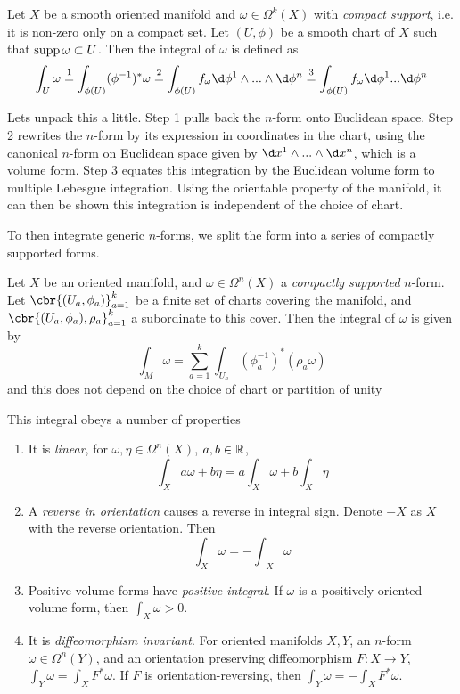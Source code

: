 \begin{definition}
	\label{def:compact_n-form_integration}
	Let \(X\) be a smooth oriented manifold and \(\omega \in \Omega^k(X)\) with \emph{compact support}, i.e. it is non-zero only on a compact set.
	Let \((U, \phi)\) be a smooth chart of \(X\) such that \(\operatorname{supp} \omega \subset U\).
	Then the integral of \(\omega\) is defined as
	\[
		\int_U \omega \overset{1}{=} \int_{\phi(U)} (\phi^{-1})^* \omega \overset{2}{=} \int_{\phi(U)} f_\omega \d\phi^1\wedge ... \wedge \d\phi^n \overset{3}{=}  \int_{\phi(U)} f_\omega \d\phi^1 ... \d\phi^n 
	\]
\end{definition}
Lets unpack this a little.
Step 1 pulls back the \(n\)-form onto Euclidean space.
Step 2 rewrites the \(n\)-form by its expression in coordinates in the chart, using the canonical \(n\)-form on Euclidean space given by \(\d x^1\wedge ... \wedge \d x^n\), which is a volume form.
Step 3 equates this integration by the Euclidean volume form to multiple Lebesgue integration.
Using the orientable property of the manifold, it can then be shown this integration is independent of the choice of chart.

To then integrate generic \(n\)-forms, we split the form into a series of compactly supported forms.
\begin{proposition}
	\label{prop:integrate_n_compact_form}
	Let \(X\) be an oriented manifold, and \(\omega\in\Omega^n(X)\) a \emph{compactly supported} \(n\)-form.
	Let \(\cbr{(U_a, \phi_a)}_{a=1}^k\) be a finite set of charts covering the manifold, and \(\cbr{(U_a, \phi_a), \rho_a}_{a=1}^k\) a  subordinate to this cover. Then the integral of \(\omega\) is given by
	\[
		\int_M \omega = \sum_{a=1}^k \int_{U_a} (\phi_a^{-1})^* (\rho_a \omega)
	\]
	and this does not depend on the choice of chart or partition of unity
\end{proposition}

This integral obeys a number of properties
\begin{enumerate}
	\item It is \emph{linear}, for \(\omega, \eta\in \Omega^n(X)\), \(a, b\in \mathbb{R}\),
	\[
		\int_X a \omega + b \eta = a \int_X \omega + b\int_X \eta 
	\]
	\item A \emph{reverse in orientation} causes a reverse in integral sign. Denote \(-X\) as \(X\) with the reverse orientation. Then
	\[
		\int_X \omega = - \int_{-X} \omega	
	\]
	\item Positive volume forms have \emph{positive integral}. If \(\omega\) is a positively oriented volume form, then \(\int_X \omega > 0\).
	\item It is \emph{diffeomorphism invariant}. For oriented manifolds \(X, Y\), an \(n\)-form \(\omega \in \Omega^n(Y)\), and an orientation preserving diffeomorphism \(F: X\to Y\), \(\int_Y \omega = \int_X F^* \omega\). If \(F\) is orientation-reversing, then \(\int_Y \omega = -\int_X F^* \omega\).
\end{enumerate}

